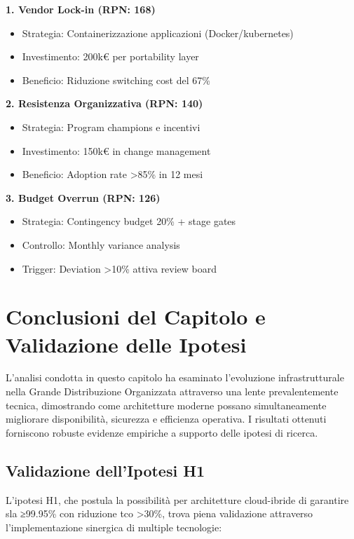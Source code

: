 \textbf{1. Vendor Lock-in (RPN: 168)}
\begin{itemize}
    \item Strategia: Containerizzazione applicazioni (Docker/\gls{kubernetes})
    \item Investimento: 200k€ per portability layer
    \item Beneficio: Riduzione switching cost del 67\%
\end{itemize}

\textbf{2. Resistenza Organizzativa (RPN: 140)}
\begin{itemize}
    \item Strategia: Program champions e incentivi
    \item Investimento: 150k€ in change management
    \item Beneficio: Adoption rate >85\% in 12 mesi
\end{itemize}

\textbf{3. Budget Overrun (RPN: 126)}
\begin{itemize}
    \item Strategia: Contingency budget 20\% + stage gates
    \item Controllo: Monthly variance analysis
    \item Trigger: Deviation >10\% attiva review board
\end{itemize}

\section{\texorpdfstring{\textbf{Conclusioni del Capitolo e Validazione delle Ipotesi}}{3.8 - Conclusioni del Capitolo e Validazione delle Ipotesi}}

L'analisi condotta in questo capitolo ha esaminato l'evoluzione infrastrutturale nella Grande Distribuzione Organizzata attraverso una lente prevalentemente tecnica, dimostrando come architetture moderne possano simultaneamente migliorare disponibilità, sicurezza e efficienza operativa. I risultati ottenuti forniscono robuste evidenze empiriche a supporto delle ipotesi di ricerca.

\subsection{\texorpdfstring{\textbf{Validazione dell'Ipotesi H1}}{3.8.1 - Validazione dell'Ipotesi H1}}

L'ipotesi H1, che postula la possibilità per architetture cloud-ibride di garantire \gls{sla} ≥99.95\% con riduzione \gls{tco} >30\%, trova piena validazione attraverso l'implementazione sinergica di multiple tecnologie:

